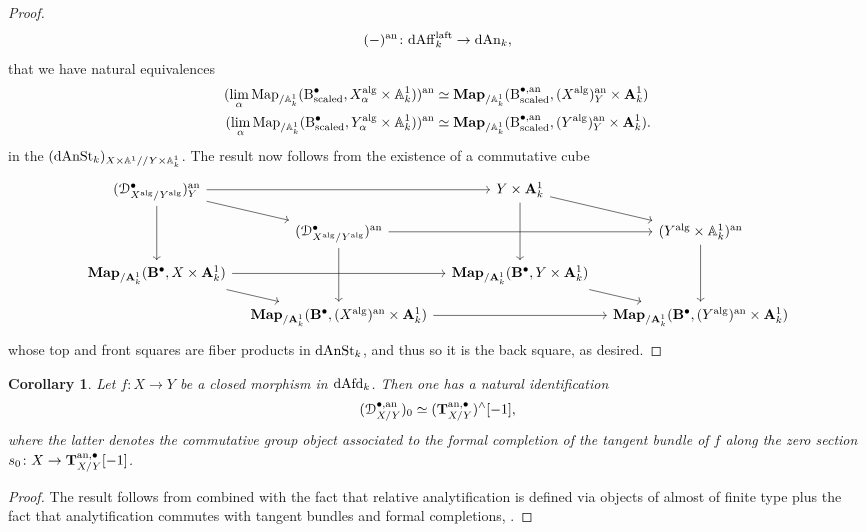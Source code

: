 \documentclass[10pt,a4paper,reqno]{amsart} %
\theoremstyle{plain}
\newtheorem{cor}[thm]{Corollary}
\theoremstyle{definition}
\theoremstyle{remark}
\numberwithin{equation}{section}
\begin{document}
\begin{proof}
        \[
            (-)^\mathrm{an} \colon \mathrm{dAff}^{\mathrm{laft}}_k \to \mathrm{dAn}_k,  
        \]
    that we have natural equivalences
        \begin{align*}
           ( \lim_\alpha \operatorname{Map}_{/\mathbb A^1_k}(\mathrm{B}^\bullet_\mathrm{scaled}, X_\alpha^\mathrm{alg} \times \mathbb A^1_k)) ^\mathrm{an} & \simeq \mathbf{Map}_{/\mathbb A^1_k}(\mathrm{B}^{\bullet, \mathrm{an}}_\mathrm{scaled}, (X^\mathrm{alg})^\mathrm{an}_Y \times \mathbf A^1_k) \\
           ( \lim_\alpha \operatorname{Map}_{/\mathbb A^1_k}(\mathrm{B}^\bullet_\mathrm{scaled}, Y_\alpha^\mathrm{alg} \times \mathbb A^1_k)) ^\mathrm{an} & \simeq \mathbf{Map}_{/\mathbb A^1_k}(\mathrm{B}^{\bullet, \mathrm{an}}_\mathrm{scaled}, (Y^\mathrm{alg})^\mathrm{an}_Y \times \mathbf A^1_k).
        \end{align*}
    in the \infcat $(\mathrm{dAnSt}_k)_{X \times \mathbb A^1/ /Y \times \mathbb A^1_k}$.
    The result now follows from the existence of a commutative cube
        \[
        \begin{tikzcd}[column sep=0.125in,row sep=0.125in]
            (\cD_{X\alg/ Y\alg}^\bullet)\an_Y \ar{rr} \ar{dd} \ar{rd} &  & Y \times \bA^1_k \ar{rd} \ar{dd} & \\
            & (\cD_{X\alg/ Y\alg}^\bullet)\an \ar{rr} \ar{dd} &  & (Y\alg \times \bbA^1_k)\an \ar{dd} \\
            \bfMap_{/\bA^1_k}(\mathbf{B}^\bullet, X \times \bA^1_k) \ar{rr} \ar{rd} & & \bfMap_{/\bA^1_k}(\mathbf{B}^\bullet, Y \times \bA^1_k) \ar{rd} \\
            & \bfMap_{/\bA^1_k}(\mathbf{B}^\bullet, (X\alg)\an \times \bA^1_k) \ar{rr} &  & \bfMap_{/\bA^1_k}(\mathbf{B}^\bullet, (Y\alg)\an \times \bA^1_k)
        \end{tikzcd}
        \]
    whose top and front squares are fiber products in $\mathrm{dAnSt}_k$, and thus so it is the back square, as desired.
\end{proof}

\begin{cor}
    Let $f \colon X \to Y$ be a closed morphism in $\mathrm{dAfd}_k$. Then one has a natural identification
        \[
            (\mathcal D^{\bullet, \mathrm{an}}_{X/Y})_0 \simeq (\mathbf T^{\mathrm{an}, \bullet}_{X/Y})^\wedge[-1] ,
        \]
    where the latter denotes the commutative group object associated to the formal completion of the tangent bundle of $f$ along the zero section $s_0 \colon
    X \to \mathbf T^{\mathrm{an}, \bullet}_{X/Y}[-1]$.
\end{cor}

\begin{proof}
    The result follows from \cite[Proposition 9.2.3.6]{Gaitsgory_Study_II} combined with the fact that relative analytification is defined via objects of almost of finite type
    plus the fact that analytification commutes with tangent bundles and formal completions, \cite[Corollary 5.20]{Holstein_Analytification_of_mapping_stacks}. 
\end{proof}
\end{document}
